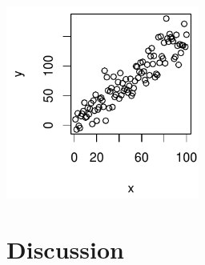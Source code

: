 \documentclass[man]{apa7}
\begin{document}
\vspace{20pt}
\begin{minipage}{\linewidth}
  \includegraphics[bb=0in 0in 2.5in 2.5in, height=2.5in, width=2.5in]{figures/Figure1.pdf}
  \label{fig:Figure1}
\end{minipage}

\section{Discussion}
\lipsum[17]

\lipsum[18]

\lipsum[19]

\printbibliography
\end{document}
